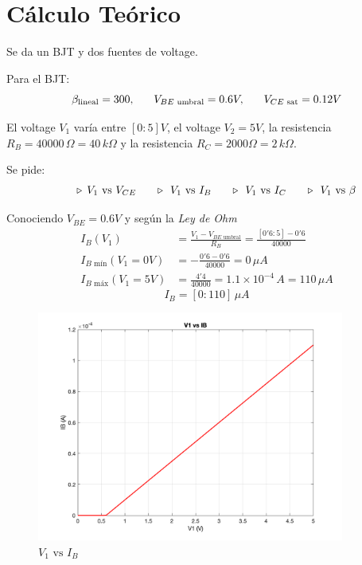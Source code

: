 \documentclass[a4paper]{article}
\begin{document}
\pagestyle{fancy}

\section{Cálculo Teórico}

Se da un BJT y dos fuentes de voltage.

Para el BJT:
$$
\beta_{\text{lineal}}=300,\hspace{4ex}V_{BE\text{ umbral}}=0.6V,\hspace{4ex}V_{CE\text{ sat}}=0.12V
$$

El voltage $V_{1}$ varía entre $[0:5]V$, el voltage $V_{2}=5V$, la resistencia $R_{B}=40000\,\Omega=40\,k\Omega$ y la resistencia $R_{C}=2000\Omega=2\,k\Omega$.

Se pide:
\begin{align*}
\hspace{4ex}\triangleright\hspace{1ex}V_{1}\text{ vs }V_{CE} 
\hspace{4ex}\triangleright\hspace{1ex}V_{1}\text{ vs }I_{B}
\hspace{4ex}\triangleright\hspace{1ex}V_{1}\text{ vs }I_{C}
\hspace{4ex}\triangleright\hspace{1ex}V_{1}\text{ vs }\beta
\end{align*}

Conociendo $V_{BE}=0.6V$ y según la \textit{Ley de Ohm}
\begin{align}
I_{B}(V_{1})&=\frac{V_{1}-V_{BE \text{ umbral}}}{R_{B}}=\frac{[0'6:5]-0'6}{40000} \\
I_{B\text{ mín}}(V_{1}=0V)&=- \frac{0'6-0'6}{40000}=0\,\mu A \\
I_{B\text{ máx}}(V_{1}=5V)&=\frac{4'4}{40000}=1.1\times 10^{-4}\,A = 110\,\mu A
\end{align}
$$
\boxed{I_{B}=[0:110]\,\mu A}
$$
\begin{figure}[H]
    \centering
    \includegraphics[width=0.9\textwidth]{IMG/bjt_2.png}
    \caption{$V_1\text{ vs }I_B$}
    \label{fig:bjt_2}
\end{figure}
\end{document}
